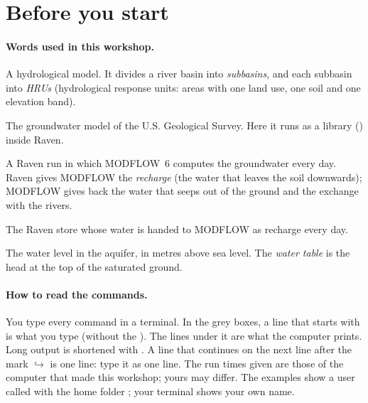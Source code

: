 \section{Before you start}
\paragraph{Words used in this workshop.}
\begin{description}[itemsep=1pt]
\item[Raven] A hydrological model. It divides a river basin into \emph{subbasins}, and each subbasin into
  \emph{HRUs} (hydrological response units: areas with one land use, one soil and one elevation band).
\item[MODFLOW~6] The groundwater model of the U.S. Geological Survey. Here it runs as a library () inside
  Raven.
\item[Coupled run] A Raven run in which MODFLOW~6 computes the groundwater every day. Raven gives MODFLOW the
  \emph{recharge} (the water that leaves the soil downwards); MODFLOW gives back the water that seeps out of the ground
  and the exchange with the rivers.
\item[\cmd{GROUNDWATER}] The Raven store whose water is handed to MODFLOW as recharge every day.
\item[Head] The water level in the aquifer, in metres above sea level. The \emph{water table} is the head at the top of
  the saturated ground.
\end{description}

\paragraph{How to read the commands.} You type every command in a terminal. In the grey boxes, a line that starts with
\cmd{\$} is what you type (without the \cmd{\$}). The lines under it are what the computer prints. Long output is
shortened with . A line that continues on the next line after the mark $\hookrightarrow$ is one line: type it
as one line. The run times given are those of the computer that made this workshop; yours may differ. The examples show a user called  with the home folder ; your
terminal shows your own name.
